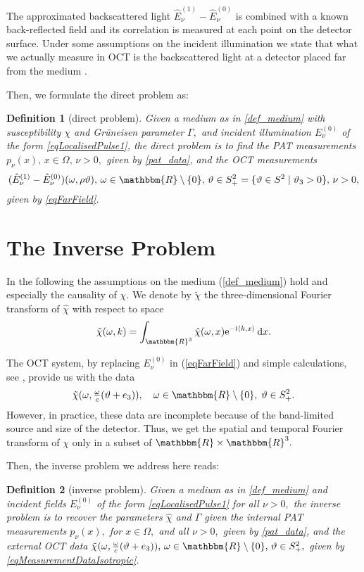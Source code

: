 \documentclass[a4paper,twoside,10pt]{article}
\theoremstyle{break}
\newtheorem{definition}[definition]{Definition}
\theoremstyle{nonumberplain}
\newcommand{\R}{\mathbbm{R}}
\newcommand{\e}{\mathrm e}
\renewcommand{\i}{\mathrm i}
\renewcommand{\d}{\,\mathrm d}
\begin{document}
The approximated backscattered light $\hat E_\nu^{(1)}- \hat E_\nu^{(0)}$ is combined with a known back-reflected field 
and its correlation is measured at each point on the detector surface. Under some assumptions on the incident 
illumination we state that what we actually measure in OCT is the backscattered light at a detector placed far from the 
medium \cite[Proposition 8]{ElbMinSch15}.

Then, we formulate the direct problem as:

\begin{definition}[direct problem]
Given a medium as in \autoref{def_medium} with susceptibility $\chi$ and Gr\"uneisen parameter $\Gamma,$ and incident illumination $E_\nu^{(0)}$ of the form \eqref{eqLocalisedPulse1}, the direct problem is to find  the PAT measurements $p_\nu (x), \, x \in \Omega, \, \nu >0,$ given by \eqref{pat_data}, and the OCT measurements $$(\hat E_\nu^{(1)}-\hat E_\nu^{(0)}) (\omega,\rho\vartheta), \, \omega\in\R\setminus\{0\}, \, \vartheta\in S^2_+ =\{\vartheta\in S^2\mid\vartheta_3>0\},\, \nu >0,$$ given by \eqref{eqFarField}.
\end{definition}



\section{The Inverse Problem}\label{sec_inv}

In the following the  assumptions on the medium (\autoref{def_medium}) hold and especially the causality of $\chi.$
We denote by $\tilde\chi $ the three-dimensional Fourier transform of $\hat\chi$ with respect to space
	\[
	\tilde\chi(\omega,k ) = \int_{\R^3} \hat \chi(\omega,x ) \e^{-\i \langle k,x\rangle} \d x.
	\]

The OCT system, by replacing $E_\nu^{(0)}$ in (\ref{eqFarField}) and simple calculations, see \cite[Proposition 9]{ElbMinSch15}, provide us with the data
\begin{equation}\label{eqMeasurementDataIsotropic}
\tilde\chi (\omega,\tfrac\omega c(\vartheta+e_3)),\quad\omega\in\R\setminus\{0\},\;\vartheta\in S^2_+ .
\end{equation}
However, in practice, these data are incomplete because of the band-limited source and size of the detector. Thus, we get the spatial and temporal Fourier transform of $\chi$ only in a subset of $\R \times \R^3 .$

Then, the inverse problem we address here reads:
\begin{definition}[inverse problem]\label{def_inverse}
Given a medium as in \autoref{def_medium} and incident fields $E^{(0)}_\nu$ of the form \eqref{eqLocalisedPulse1} for all $\nu >0,$ the inverse problem is to recover the parameters $\hat\chi$ and $\Gamma$ given the internal PAT measurements $p_\nu(x),$ for $x\in \Omega,$ and all $\nu>0,$ given by  \eqref{pat_data}, and the external OCT data  $\tilde\chi (\omega,\tfrac\omega c(\vartheta+e_3)), \, \omega\in\R\setminus\{0\}, \, \vartheta\in S^2_+ ,$ given by \eqref{eqMeasurementDataIsotropic}.
 \end{definition}
\end{document}
